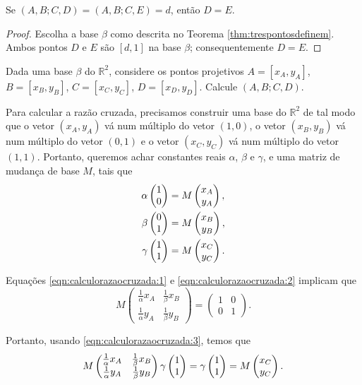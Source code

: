 \begin{prop}
  Se \((A, B; C, D) = (A, B; C, E) = d\), então  \(D = E\).
\end{prop}
\begin{proof}
  Escolha a base \(\beta\) como descrita no Teorema \ref{thm:trespontosdefinem}. Ambos pontos \(D\) e \(E\) são \([d, 1]\) na base \(\beta\); consequentemente \(D = E\).
\end{proof}

\begin{exer}
Dada uma base \(\beta\) do \(\mathbb{R}^2\), considere os pontos projetivos $A = [x_A,y_A]$, $B = [x_B,y_B]$, $C = [x_C,y_C]$, $D = [x_D,y_D]$.
Calcule $(A,B;C,D)$.
\end{exer}
\begin{sol}
  Para calcular a razão cruzada, precisamos construir uma base do $\mathbb{R}^2$ de tal modo que o vetor $(x_A,y_A)$ vá num múltiplo do vetor $(1,0)$, o vetor $(x_B,y_B)$ vá num múltiplo do vetor $(0,1)$ e o vetor $(x_C,y_C)$ vá num múltiplo do vetor $(1,1)$.
  Portanto, queremos achar constantes reais \(\alpha\), \(\beta\) e \(\gamma\), e uma matriz de mudança de base \(M\), tais que 
    \begin{align}
      \alpha \begin{pmatrix} 1 \\ 0 \\  \end{pmatrix} &= M \begin{pmatrix} x_A \\ y_A \\  \end{pmatrix} \label{eqn:calculorazaocruzada:1}, \\
      \beta  \begin{pmatrix} 0 \\ 1 \\  \end{pmatrix} &= M \begin{pmatrix} x_B \\ y_B \\  \end{pmatrix} \label{eqn:calculorazaocruzada:2}, \\
      \gamma \begin{pmatrix} 1 \\ 1 \\  \end{pmatrix} &= M \begin{pmatrix} x_C \\ y_C \\  \end{pmatrix} \label{eqn:calculorazaocruzada:3}. 
    \end{align} 

  Equações \ref{eqn:calculorazaocruzada:1} e \ref{eqn:calculorazaocruzada:2} implicam que
  \begin{equation} \label{eqn:calculorazaocruzada:4}
    M \begin{pmatrix} \frac{1}{\alpha} x_A& \frac{1}{\beta} x_B\\ \frac{1}{\alpha} y_A& \frac{1}{\beta} y_B \end{pmatrix} 
    = \begin{pmatrix} 1 & 0 \\ 0 & 1 \end{pmatrix}.
  \end{equation}

  Portanto, usando \ref{eqn:calculorazaocruzada:3}, temos que
  \begin{equation}
    M \begin{pmatrix} \frac{1}{\alpha} x_A& \frac{1}{\beta} x_B\\ \frac{1}{\alpha} y_A& \frac{1}{\beta} y_B \end{pmatrix} \gamma \begin{pmatrix} 1 \\ 1 \\  \end{pmatrix}
    = \gamma \begin{pmatrix} 1 \\ 1 \\  \end{pmatrix}
    = M \begin{pmatrix} x_C \\ y_C \\  \end{pmatrix}.
  \end{equation}


\end{sol}
